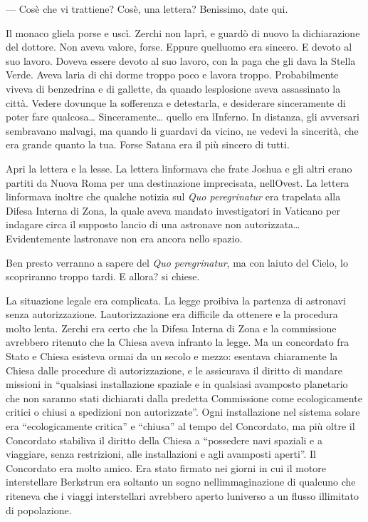 --- Cos\textquotesingle è che vi trattiene? Cos\textquotesingle è, una
lettera? Benissimo, date qui.

Il monaco gliela porse e uscì. Zerchi non l\textquotesingle aprì, e
guardò di nuovo la dichiarazione del dottore. Non aveva valore, forse.
Eppure quell\textquotesingle uomo era sincero. E devoto al suo lavoro.
Doveva essere devoto al suo lavoro, con la paga che gli dava la Stella
Verde. Aveva l\textquotesingle aria di chi dorme troppo poco e lavora
troppo. Probabilmente viveva di benzedrina e di gallette, da quando
l\textquotesingle esplosione aveva assassinato la città. Vedere dovunque
la sofferenza e detestarla, e desiderare sinceramente di poter fare
qualcosa\ldots{} Sinceramente\ldots{} quello era
l\textquotesingle Inferno. In distanza, gli avversari sembravano
malvagi, ma quando li guardavi da vicino, ne vedevi la sincerità, che
era grande quanto la tua. Forse Satana era il più sincero di tutti.

Apri la lettera e la lesse. La lettera l\textquotesingle informava che
frate Joshua e gli altri erano partiti da Nuova Roma per una
destinazione imprecisata, nell\textquotesingle Ovest. La lettera
l\textquotesingle informava inoltre che qualche notizia sul \emph{Quo
	peregrinatur} era trapelata alla Difesa Interna di Zona, la quale aveva
mandato investigatori in Vaticano per indagare circa il supposto lancio
di una astronave non autorizzata\ldots{} Evidentemente
l\textquotesingle astronave non era ancora nello spazio.

Ben presto verranno a sapere del \emph{Quo peregrinatur}, ma con
l\textquotesingle aiuto del Cielo, lo scopriranno troppo tardi. E
allora? si chiese.

La situazione legale era complicata. La legge proibiva la partenza di
astronavi senza autorizzazione. L\textquotesingle autorizzazione era
difficile da ottenere e la procedura molto lenta. Zerchi era certo che
la Difesa Interna di Zona e la commissione avrebbero ritenuto che la
Chiesa aveva infranto la legge. Ma un concordato fra Stato e Chiesa
esisteva ormai da un secolo e mezzo: esentava chiaramente la Chiesa
dalle procedure di autorizzazione, e le assicurava il diritto di mandare
missioni in ``qualsiasi installazione spaziale e in qualsiasi avamposto
planetario che non saranno stati dichiarati dalla predetta Commissione
come ecologicamente critici o chiusi a spedizioni non autorizzate''.
Ogni installazione nel sistema solare era ``ecologicamente critica'' e
``chiusa'' al tempo del Concordato, ma più oltre il Concordato stabiliva
il diritto della Chiesa a ``possedere navi spaziali e a viaggiare, senza
restrizioni, alle installazioni e agli avamposti aperti''. Il Concordato
era molto amico. Era stato firmato nei giorni in cui il motore
interstellare Berkstrun era soltanto un sogno
nell\textquotesingle immaginazione di qualcuno che riteneva che i viaggi
interstellari avrebbero aperto l\textquotesingle universo a un flusso
illimitato di popolazione.

